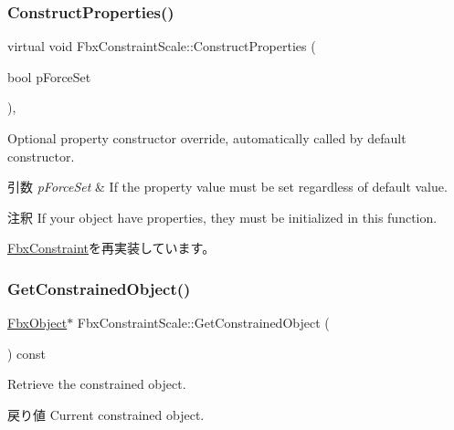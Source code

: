 \subsubsection{\texorpdfstring{Construct\+Properties()}{ConstructProperties()}}
{\footnotesize\ttfamily virtual void Fbx\+Constraint\+Scale\+::\+Construct\+Properties (\begin{DoxyParamCaption}\item[{bool}]{p\+Force\+Set }\end{DoxyParamCaption})\hspace{0.3cm}{\ttfamily [protected]}, {\ttfamily [virtual]}}

Optional property constructor override, automatically called by default constructor. 
\begin{DoxyParams}{引数}
{\em p\+Force\+Set} & If the property value must be set regardless of default value. \\
\hline
\end{DoxyParams}
\begin{DoxyRemark}{注釈}
If your object have properties, they must be initialized in this function. 
\end{DoxyRemark}


\hyperlink{class_fbx_constraint_a0470a25b813b337d07a03ce4b97b44f8}{Fbx\+Constraint}を再実装しています。

\mbox{\label{class_fbx_constraint_scale_a1dcbdc6b41d04d6a75ca47f024e05dc9}} 
\subsubsection{\texorpdfstring{Get\+Constrained\+Object()}{GetConstrainedObject()}}
{\footnotesize\ttfamily \hyperlink{class_fbx_object}{Fbx\+Object}$\ast$ Fbx\+Constraint\+Scale\+::\+Get\+Constrained\+Object (\begin{DoxyParamCaption}{ }\end{DoxyParamCaption}) const\hspace{0.3cm}{\ttfamily [virtual]}}

Retrieve the constrained object. \begin{DoxyReturn}{戻り値}
Current constrained object. 
\end{DoxyReturn}


